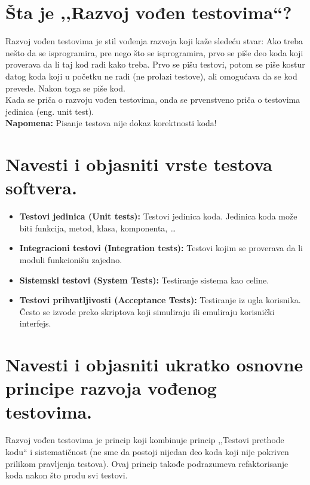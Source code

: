 \documentclass[a4paper]{article}
\begin{document}
\section{Šta je ,,Razvoj vođen testovima``?}
  Razvoj vođen testovima je stil vođenja razvoja koji kaže sledeću stvar: Ako treba nešto 
  da se isprogramira, pre nego što se isprogramira, prvo se piše deo koda koji proverava
  da li taj kod radi kako treba. Prvo se pišu testovi, potom se piše kostur datog koda koji
  u početku ne radi (ne prolazi testove), ali omogućava da se kod prevede. Nakon toga se piše kod.\\

  Kada se priča o razvoju vođen testovima, onda se prvenstveno priča o testovima jedinica (eng. unit
  test).\\

  \noindent \textbf{Napomena:} Pisanje testova nije dokaz korektnosti koda!

\section{Navesti i objasniti vrste testova softvera.}
  \begin{itemize}
    \item \textbf{Testovi jedinica (Unit tests):} Testovi jedinica koda. Jedinica koda
          može biti funkcija, metod, klasa, komponenta, \dots
    \item \textbf{Integracioni testovi (Integration tests):} Testovi kojim se proverava da li
          moduli funkcionišu zajedno.
    \item \textbf{Sistemski testovi (System Tests):} Testiranje sistema kao celine.
    \item \textbf{Testovi prihvatljivosti (Acceptance Tests):} Testiranje iz ugla korisnika. Često
          se izvode preko skriptova koji simuliraju ili emuliraju korisnički interfejs.
  \end{itemize}

\section{Navesti i objasniti ukratko osnovne principe razvoja vođenog testovima.}
  Razvoj vođen testovima je princip koji kombinuje princip ,,Testovi prethode kodu`` i 
  sistematičnost (ne sme da postoji nijedan deo koda koji nije pokriven prilikom pravljenja
  testova). Ovaj princip takođe podrazumeva refaktorisanje koda nakon što prođu svi testovi.
\end{document}
